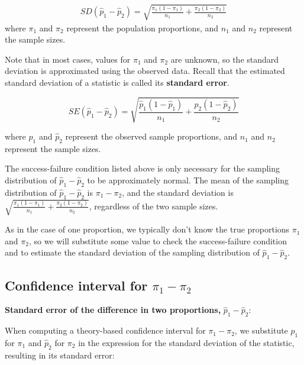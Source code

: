 \documentclass[
  10pt,
  openany]{book}
\theoremstyle{definition}
\theoremstyle{definition}
\theoremstyle{definition}
\theoremstyle{definition}
\theoremstyle{remark}
\begin{document}
\begin{eqnarray*}
  SD(\hat{p}_1 - \hat{p}_2) = \sqrt{\frac{\pi_1(1-\pi_1)}{n_1} + \frac{\pi_2(1-\pi_2)}{n_2}}
  \end{eqnarray*} where \(\pi_1\) and \(\pi_2\) represent the population proportions, and \(n_1\) and \(n_2\) represent the sample sizes.

Note that in most cases, values for \(\pi_1\) and \(\pi_2\) are unknown, so the standard deviation is approximated using the observed data. Recall that the estimated standard deviation of a statistic is called its \textbf{standard error}.

\[SE(\hat{p}_1 - \hat{p}_2) = \sqrt{\frac{\hat{p}_1(1-\hat{p}_1)}{n_1} + \frac{\hat{p}_2(1-\hat{p}_2)}{n_2}}\]

where \(\hat{p}_1\) and \(\hat{p}_2\) represent the observed sample proportions, and \(n_1\) and \(n_2\) represent the sample sizes.


The success-failure condition listed above is only necessary for the sampling distribution of \(\hat{p}_1 - \hat{p}_2\) to be approximately normal. The mean of the sampling distribution of \(\hat{p}_1 - \hat{p}_2\) is \(\pi_1 - \pi_2\), and the standard deviation is \(\sqrt{\frac{\pi_1(1-\pi_1)}{n_1}+\frac{\pi_2(1-\pi_2)}{n_2}}\), regardless of the two sample sizes.

As in the case of one proportion, we typically don't know the true proportions \(\pi_1\) and \(\pi_2\), so we will substitute some value to check the success-failure condition and to estimate the standard deviation of the sampling distribution of \(\hat{p}_1 - \hat{p}_2\).

\subsection{\texorpdfstring{Confidence interval for \(\pi_1 - \pi_2\)}{Confidence interval for \textbackslash pi\_1 - \textbackslash pi\_2}}\label{confidence-interval-for-pi_1---pi_2}


\textbf{Standard error of the difference in two proportions,} \(\hat{p}_1 -\hat{p}_2\):

When computing a theory-based confidence interval for \(\pi_1 - \pi_2\), we substitute \(\hat{p}_1\) for \(\pi_1\) and \(\hat{p}_2\) for \(\pi_2\) in the expression for the standard deviation of the statistic, resulting in its standard error:
\end{document}
